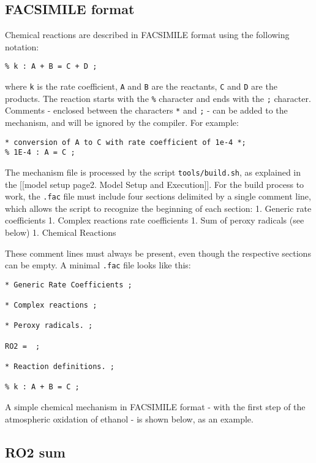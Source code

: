 \subsection{FACSIMILE format} \label{facsimile-format}

Chemical reactions are described in FACSIMILE format using the following
notation:

\begin{verbatim}
% k : A + B = C + D ;
\end{verbatim}

where \texttt{k} is the rate coefficient, \texttt{A} and \texttt{B} are
the reactants, \texttt{C} and \texttt{D} are the products. The reaction
starts with the \texttt{\%} character and ends with the \texttt{;}
character. Comments - enclosed between the characters \texttt{*} and
\texttt{;} - can be added to the mechanism, and will be ignored by the
compiler. For example:

\begin{verbatim}
* conversion of A to C with rate coefficient of 1e-4 *;
% 1E-4 : A = C ;
\end{verbatim}

The mechanism file is processed by the script \texttt{tools/build.sh},
as explained in the {[}{[}model setup page\textbar{}2. Model Setup and
Execution{]}{]}. For the build process to work, the \texttt{.fac} file
must include four sections delimited by a single comment line, which
allows the script to recognize the beginning of each section: 1. Generic
rate coefficients 1. Complex reactions rate coefficients 1. Sum of
peroxy radicals (see below) 1. Chemical Reactions

These comment lines must always be present, even though the respective
sections can be empty. A minimal \texttt{.fac} file looks like this:

\begin{verbatim}
* Generic Rate Coefficients ;

* Complex reactions ;

* Peroxy radicals. ;

RO2 =  ;

* Reaction definitions. ;

% k : A + B = C ;
\end{verbatim}

A simple chemical mechanism in FACSIMILE format - with the first step of
the atmospheric oxidation of ethanol - is shown below, as an example.

\subsection{RO2 sum} \label{ro2-sum}

